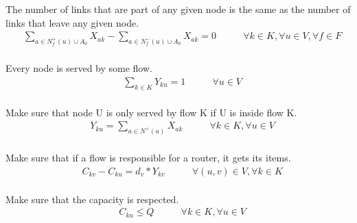 The number of links that are part of any given node is the same as the number of links that leave any given node. \\

\begin{align*}
    &\sum_{a\in N_f^+(u) \cup A_0}{X_{ak}} - \sum_{a\in N_f^-(u) \cup A_0}{X_{ak}} = 0 & \qquad \forall k \in K, \forall u \in V, \forall f \in F \\
\end{align*}

Every node is served by some flow. \\

\begin{align*}
    &\sum_{k \in K}{Y_{ku}=1} & \qquad \forall u \in V \\
\end{align*}

Make sure that node U is only served by flow K if U is inside flow K. \\

\begin{align*}
   &Y_{ku} = \sum_{a\in N^+(u)}{X_{ak}} & \qquad \forall k \in K, \forall u \in V\\
\end{align*}

Make sure that if a flow is responsible for a router, it gets its items. \\

\begin{align*}
    &C_{kv} - C_{ku} = d_v * Y_{kv} & \qquad \forall (u,v) \in V, \forall k \in K\\
\end{align*}

Make sure that the capacity is respected. \\

\begin{align*}
     &C_{ku} \leq Q & \qquad \forall k \in K, \forall u \in V \\
\end{align*}